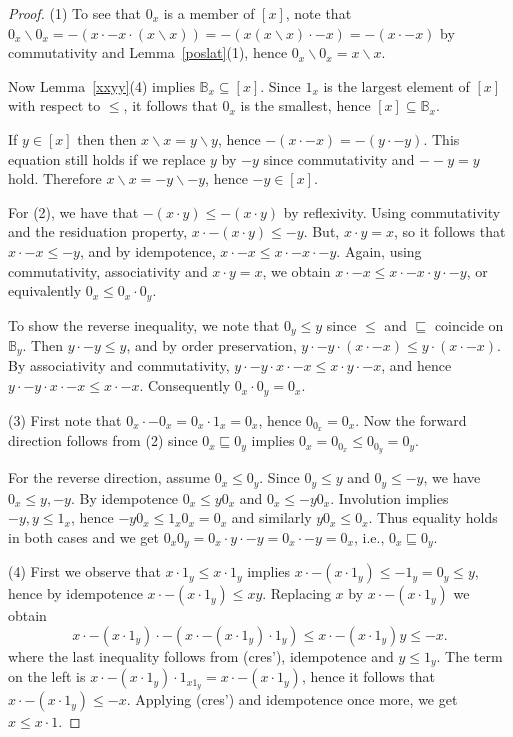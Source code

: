 \documentclass[12pt]{amsart}
\newcommand{\ld}{{\backslash}}
\begin{document}
\begin{proof}
(1) To see that $0_x$ is a member of $[x]$, note that $0_x\ld 0_x=-(x\cdot -x\cdot (x\ld x))=
-(x(x\ld x)\cdot -x)=-(x\cdot -x)$ by commutativity and Lemma~\ref{poslat}(1), hence
$0_x\ld 0_x=x\ld x$.

Now Lemma~\ref{xxyy}(4) implies $\mathbb B_x\subseteq [x]$. Since $1_x$ is the largest
element of $[x]$ with respect to $\le$, it follows that $0_x$ is the smallest, hence $[x]\subseteq \mathbb B_x$.

If $y\in [x]$ then
then $x\ld x=y\ld y$, hence $-(x\cdot -x)=-(y\cdot -y)$. This equation still holds if we replace $y$ by $-y$ since commutativity and $-{-}y=y$ hold. Therefore $x\ld x=-y\ld{-}y$, hence $-y\in [x]$.

For (2), we have that $-(x \cdot y) \le -(x \cdot y)$ by reflexivity. Using commutativity and the residuation property, $x \cdot - (x \cdot y) \le -y$. But, $x \cdot y = x$, so it follows that $x \cdot - x \le -y$, and by idempotence, $x \cdot -x \le x \cdot -x \cdot -y$. Again, using commutativity, associativity and $x \cdot y = x$, we obtain $x \cdot -x \le x \cdot -x \cdot y \cdot -y$, or equivalently $0_x \le 0_x \cdot 0_y$.

To show the reverse inequality, we note that $0_y \le y$ since $\le$ and $\sqsubseteq$ coincide on $\mathbb{B}_y$. Then $y \cdot - y \le y$, and by order preservation, $y\cdot -y \cdot (x\cdot -x) \le y \cdot (x \cdot -x)$. By associativity and commutativity, $y\cdot -y \cdot x \cdot -x \le x \cdot y \cdot -x$, and hence $y\cdot -y \cdot x \cdot -x \le x \cdot -x$. Consequently $0_x \cdot 0_y = 0_x$.

(3) First note that $0_x\cdot -0_x=0_x\cdot 1_x=0_x$, hence
$0_{0_x}=0_x$. Now the forward direction follows from (2) since $0_x\sqsubseteq 0_y$ implies $0_x=0_{0_x}\le 0_{0_y}=0_y$.

For the reverse direction, assume $0_x\le 0_y$.
Since $0_y\le y$ and $0_y\le -y$, we have $0_x\le y, -y$. By idempotence
$0_x\le y0_x$ and $0_x\le -y0_x$. Involution implies $-y,y\le 1_x$, hence
$-y0_x\le 1_x0_x=0_x$ and similarly $y0_x\le 0_x$. Thus equality holds in both cases and
we get $0_x0_y=0_x\cdot y\cdot-y=0_x\cdot -y=0_x$, i.e., $0_x\sqsubseteq 0_y$.

(4) First we observe that $x\cdot 1_y\le x\cdot 1_y$ implies $x\cdot -(x\cdot 1_y)\le -1_y=0_y\le y$,
hence by idempotence $x\cdot -(x\cdot 1_y)\le xy$. Replacing $x$ by $x\cdot-(x\cdot 1_y)$ we obtain
$$
x\cdot-(x\cdot 1_y)\cdot -(x\cdot-(x\cdot 1_y)\cdot 1_y)\le x\cdot-(x\cdot 1_y)y\le -x.
$$
where the last inequality follows from (cres'), idempotence and $y\le 1_y$.
The term on the left is $x\cdot-(x\cdot 1_y)\cdot 1_{x1_y}=x\cdot-(x\cdot 1_y)$,
hence it follows that $x\cdot-(x\cdot 1_y)\le -x$. Applying (cres') and idempotence once more, we get $x\le x\cdot 1$.


\end{proof}
\end{document}
